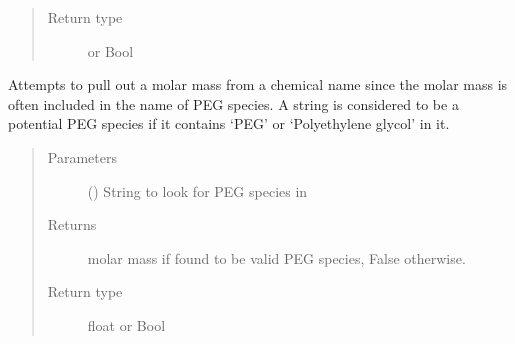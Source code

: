 \documentclass[letterpaper,10pt,english]{sphinxmanual}
\begin{document}
\begin{fulllineitems}
\begin{fulllineitems}
\begin{quote}
\begin{description}
\item[{Return type}] \leavevmode
{\hyperref[\detokenize{polo.crystallography:polo.crystallography.cocktail.SignedValue}]{}} or Bool

\end{description}\end{quote}

\end{fulllineitems}


\begin{fulllineitems}
\label{\detokenize{polo.crystallography:polo.crystallography.cocktail.Reagent.peg_parser}}
Attempts to pull out a molar mass from a chemical name since the
molar mass is often included in the name of PEG species. A string is
considered to be a potential PEG species if it contains ‘PEG’ or
‘Polyethylene glycol’ in it.
\begin{quote}\begin{description}
\item[{Parameters}] \leavevmode
{} () \textendash{} String to look for PEG species in

\item[{Returns}] \leavevmode
molar mass if found to be valid PEG species, False otherwise.

\item[{Return type}] \leavevmode
float or Bool

\end{description}\end{quote}

\end{fulllineitems}



\end{fulllineitems}
\end{document}
